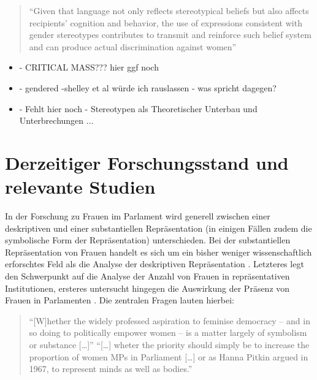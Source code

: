 \documentclass[12pt, 
    twoside=false, 
    bibliography=totoc, 
    numbers=endperiod, 
    headings=normal, 
    toc=chapterentrydotfill
    ]{scrbook}
\begin{document}
\begin{quote}
    \enquote{Given that language not only reflects stereotypical beliefs but also affects recipients’ cognition and behavior, the use of expressions consistent with gender stereotypes contributes to transmit and reinforce such belief system and can produce actual discrimination against women} \parencite[2]{menegatti_2017}
\end{quote}

\begin{itemize}
\item - CRITICAL MASS???  hier ggf noch 
\item - gendered -shelley et al würde ich rauslassen - was spricht dagegen? 
\item - Fehlt hier noch - Stereotypen als Theoretischer Unterbau und Unterbrechungen ...
\end{itemize}



\section {Derzeitiger Forschungsstand und relevante Studien }

In der Forschung zu Frauen im Parlament wird generell zwischen einer deskriptiven und einer substantiellen Repräsentation (in einigen Fällen zudem die symbolische Form der Repräsentation) unterschieden. Bei der substantiellen Repräsentation von Frauen handelt es sich um ein bisher weniger wissenschaftlich erforschtes Feld als die Analyse der deskriptiven Repräsentation \parencite[59]{wangnerud_2009}. 
Letzteres legt den Schwerpunkt auf die Analyse der Anzahl von Frauen in repräsentativen Institutionen, ersteres untersucht hingegen die Auswirkung der Präsenz von Frauen in Parlamenten \parencites[14]{coffe_2013}[52]{wangnerud_2009}.
Die zentralen Fragen lauten hierbei:

\begin{quote}
  \enquote{[W]hether the widely professed aspiration to feminise democracy -- and in so doing to politically empower women -- is a matter largely of symbolism or substance […]}
  \enquote{[…] wheter the priority should simply be to increase the proportion of women MPs in Parliament […] or as Hanna Pitkin argued in 1967, to represent minds as well as bodies.}
  \parencite[413]{blaxill_2016}
\end{quote}
\end{document}
